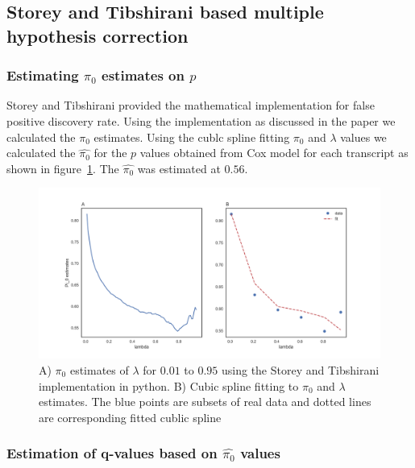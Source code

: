 \documentclass{article}
\begin{document}
	
	\subsection { Storey and Tibshirani \cite{storey2003statistical}  based multiple hypothesis correction }
	
	\subsubsection {Estimating $\pi_0$ estimates on $p$}
	
	Storey and Tibshirani \cite{storey2003statistical} provided the mathematical implementation for false positive discovery rate.  Using the implementation as discussed in the paper we calculated the $\pi_0$ estimates. Using the cublc spline fitting $\pi_0$ and  $\lambda$ values we calculated the  $\hat {\pi_0}$ for the $p$ values obtained from Cox model for each transcript as shown in figure~\ref{fig:estimate_pi}. The  $\hat {\pi_0}$  was estimated at $0.56$. 

\begin{figure}[bh]
    \centering
     \includegraphics[width=\textwidth]{lambdaestimatescurvefitting.png}
    \caption{ A) $\pi_0$ estimates of $\lambda$  for $0.01$ to $0.95$ using the Storey and Tibshirani \cite{storey2003statistical} implementation in python. B) Cubic spline fitting to $\pi_0$  and $\lambda$ estimates. The blue points are subsets of real data and dotted lines are corresponding  fitted cublic spline   \tiny}
    \label{fig:estimate_pi}
\end{figure}

	\subsubsection {Estimation of q-values based on $\hat {\pi_0}$  values }
\end{document}
